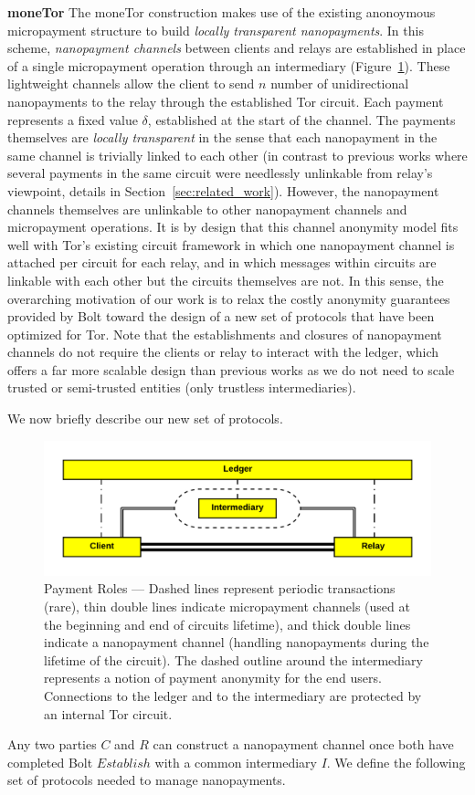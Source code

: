 \textbf{moneTor} The moneTor construction makes use of the existing anonoymous
micropayment structure to build \emph{locally transparent nanopayments}. In this
scheme, \emph{nanopayment channels} between clients and relays are established
in place of a single micropayment operation through an intermediary
(Figure~\ref{fig:parties}). These lightweight channels allow the client to send
$n$ number of unidirectional nanopayments to the relay through the established
Tor circuit. Each payment represents a fixed value $\delta$, established at the
start of the channel. The payments themselves are \emph{locally transparent} in
the sense that each nanopayment in the same channel is trivially linked to each
other (in contrast to previous works where several payments in the same circuit
were needlessly unlinkable from relay's viewpoint, details in
Section~\ref{sec:related_work}). However, the nanopayment channels themselves
are unlinkable to other nanopayment channels and micropayment operations. It is
by design that this channel anonymity model fits well with Tor's existing
circuit framework in which one nanopayment channel is attached per circuit for
each relay, and in which messages within circuits are linkable with each other
but the circuits themselves are not. In this sense, the overarching motivation
of our work is to relax the costly anonymity guarantees provided by Bolt toward
the design of a new set of protocols that have been optimized for Tor. Note that
the establishments and closures of nanopayment channels do not require the
clients or relay to interact with the ledger, which offers a far more scalable
design than previous works as we do not need to scale trusted or semi-trusted
entities (only trustless intermediaries).

 We now briefly describe our new set of protocols.
\begin{figure}[h] \centering
  \includegraphics[trim={0.5cm, 0.5cm, 0.5cm, 0.5cm}, clip,
    scale=0.6]{images/party_diagram.png}
  \caption[Payment Roles]{Payment Roles --- Dashed lines represent periodic
    transactions (rare), thin double lines indicate micropayment channels (used
    at the beginning and end of circuits lifetime), and thick double lines
    indicate a nanopayment channel (handling nanopayments during the lifetime of
    the circuit). The dashed outline around the intermediary represents a notion
    of payment anonymity for the end users. Connections to the ledger and to the
    intermediary are protected by an internal Tor circuit.}
  \label{fig:parties}
\end{figure}
Any two parties $C$ and $R$ can construct a nanopayment channel once both have
completed Bolt $Establish$ with a common intermediary $I$. We define the
following set of protocols needed to manage nanopayments.


